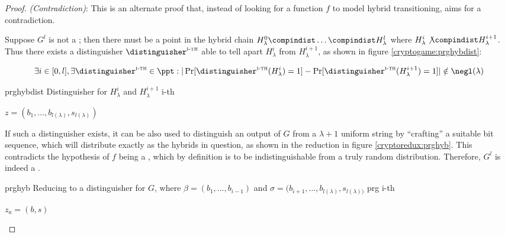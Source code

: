 \begin{proof}
    \textit{(Contradiction)}: This is an alternate proof that, instead of looking for a function $f$ to model hybrid transitioning, aims for a contradiction.
    
    Suppose $G^l$ is not a \prg; then there must be a point in the hybrid chain $H_\lambda^0 \compindist \dots \compindist H_\lambda^l$ where $H_\lambda^i \not\compindist H_\lambda^{i + 1}$. Thus there exists a distinguisher $\distinguisher^{\textsc{i-th}}$ able to tell apart $H_\lambda^i$ from $H_\lambda^{i + 1}$, as shown in figure \ref{cryptogame:prghybdist}:

    \[
        \exists i \in [0, l], \exists \distinguisher^{\textsc{i-th}} \in \ppt : |\Pr[\distinguisher^{\textsc{i-th}}(H_\lambda^i) = 1] - \Pr[\distinguisher^{\textsc{i-th}}(H_\lambda^{i + 1}) = 1]| \notin \negl(\lambda)
    \]

    \begin{cryptogame}
        {prghybdist}
        {Distinguisher for $H_{\lambda}^{i}$ and $H_{\lambda}^{i+1}$}
        {i-th}

        {$z = (b_{1}, \dots ,b_{l(\lambda)}, s_{l(\lambda)})$}{}

        \cseqdelay
        

    \end{cryptogame}

    If such a distinguisher exists, it can be also used to distinguish an output of $G$ from a $\lambda+1$ uniform string by ``crafting'' a suitable bit sequence, which will distribute exactly as the hybrids in question, as shown in the reduction in figure \ref{cryptoredux:prghyb}. This contradicts the hypothesis of $f$ being a \prg, which by definition is to be indistinguishable from a truly random distribution. Therefore, $G^l$ is indeed a \prg.

    \begin{cryptoredux}
        {prghyb}
        {Reducing to a distinguisher for $G$, where $\beta = (b_1, \dots, b_{i-1})$ and $\sigma = (b_{i+1}, \dots, b_{l(\lambda)}, s_{l(\lambda))}$}
        {prg}
        {i-th}

        {$z_a = (b, s)$}{}


\end{cryptoredux}
\end{proof}
